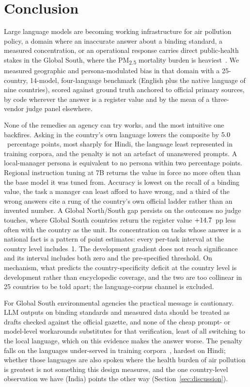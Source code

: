 \section{Conclusion}
\label{sec:conclusion}

Large language models are becoming working infrastructure for air pollution
policy, a domain where an inaccurate answer about a binding standard, a measured
concentration, or an operational response carries direct public-health stakes
in the Global South, where the PM\textsubscript{2.5} mortality burden is
heaviest~\citep{gbd2019risk,requia2024shortterm}. We measured geographic and
persona-modulated bias in that domain with a 25-country, 14-model,
four-language benchmark (English plus the native language of nine countries),
scored against ground truth anchored to official primary sources, by code
wherever the answer is a register value and by the mean of a three-vendor judge
panel elsewhere.

None of the remedies an agency can try works, and the most intuitive one
backfires. Asking in the country's own language lowers the composite by
$5.0$~percentage points, most sharply for Hindi, the language least
represented in training corpora, and the penalty is not an artefact of unanswered
prompts. A local-manager persona is equivalent to no persona within two
percentage points. Regional instruction tuning at 7B returns the value in force
no more often than the base model it was tuned from. Accuracy is lowest on the
recall of a binding value, the task a manager can least afford to have wrong,
and a third of the wrong answers cite a rung of the country's own official
ladder rather than an invented number. A Global North/South gap persists on the
outcomes no judge touches, where Global South countries return the register
value $+14.7$~pp less often with the country as the unit. Its concentration
on tasks whose answer is a national fact is a pattern of point estimates:
every per-task interval at the country level includes~1. The development
gradient does not reach significance and its interval includes both zero and the
pre-specified threshold. On mechanism, what predicts the country-specificity
deficit at the country level is development rather than encyclopedic coverage,
and the two are too collinear in 25 countries to be told apart; the
language-corpus channel is excluded.

For Global South environmental agencies the practical message is cautionary.
LLM outputs on binding standards and measured data should be treated as drafts
checked against the official gazette, and none of the cheap prompt- or
model-level workarounds substitutes for that verification, least of all
switching to the local language, which on this evidence makes the answer worse.
The penalty falls on the languages under-served in training
corpora~\citep{joshi2020state}, hardest on Hindi; whether those languages are
also spoken where the health burden of air pollution is greatest is not
something this design measures, and the one country-level observation we have
(India) points the other way (Section~\ref{sec:discussion}).

